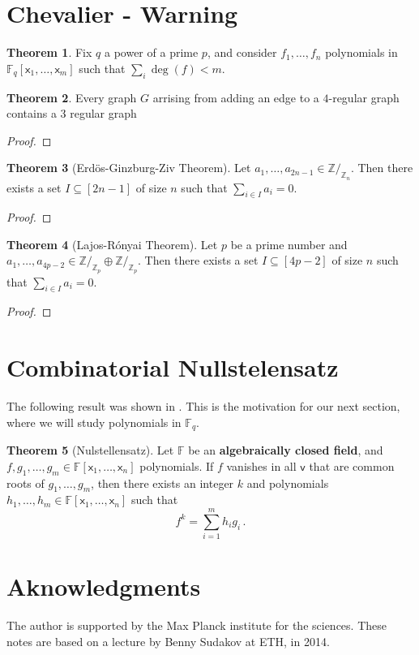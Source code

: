 \documentclass[12pt]{amsart}
\theoremstyle{definition}
\newtheorem{thm}{Theorem}[section]
\newcommand{\Z}{\mathbb{Z}}
\newcommand{\F}{\mathbb{F}}
\newcommand{\vv}{\mathsf{v}}
\newcommand{\vx}{\mathsf{x}}
\begin{document}
\section{Chevalier - Warning}

\begin{thm}
Fix $q$ a power of a prime $p$, and consider $f_1, \ldots, f_n$ polynomials in $\F_q[\vx_1, \ldots , \vx_m]$ such that $\sum_i \deg (f) < m$.
\end{thm}





\begin{thm}
Every graph $G$ arrising from adding an edge to a $4$-regular graph contains a $3$ regular graph
\end{thm}

\begin{proof}

\end{proof}


\begin{thm}[Erd\"os-Ginzburg-Ziv Theorem]
Let $a_1, \ldots, a_{2n-1} \in \Z/_{\Z_n} $.
Then there exists a set $I\subseteq [2n-1] $ of size $n$ such that $\sum_{i\in I} a_i = 0$.
\end{thm}

\begin{proof}

\end{proof}

\begin{thm}[Lajos-R\'onyai Theorem]
Let $p$ be a prime number and  $a_1, \ldots, a_{4p-2} \in \Z/_{\Z_p}\oplus \Z/_{\Z_p} $.
Then there exists a set $I\subseteq [4p-2] $ of size $n$ such that $\sum_{i\in I} a_i = 0$.
\end{thm}

\begin{proof}

\end{proof}


\section{Combinatorial Nullstelensatz}


The following result was shown in \cite{hilbert1893ueber}.
This is the motivation for our next section, where we will study polynomials in $\F_q$.

\begin{thm}[Nulstellensatz]
Let $\F$ be an \textbf{algebraically closed field}, and $f, g_1, \ldots, g_m\in \F[\vx_1, \ldots, \vx_n]$ polynomials.
If $f$ vanishes in all $\vv$ that are common roots of $g_1, \ldots, g_m$, then there exists an integer $k$ and polynomials $h_1, \ldots, h_m \in \F[\vx_1, \ldots, \vx_n]$ such that
$$ f^k = \sum_{i=1}^m h_i g_i \, . $$
\end{thm}




\section*{Aknowledgments}
The author is supported by the Max Planck institute for the sciences. 
These notes are based on a lecture by Benny Sudakov at ETH, in 2014.



\end{document}
